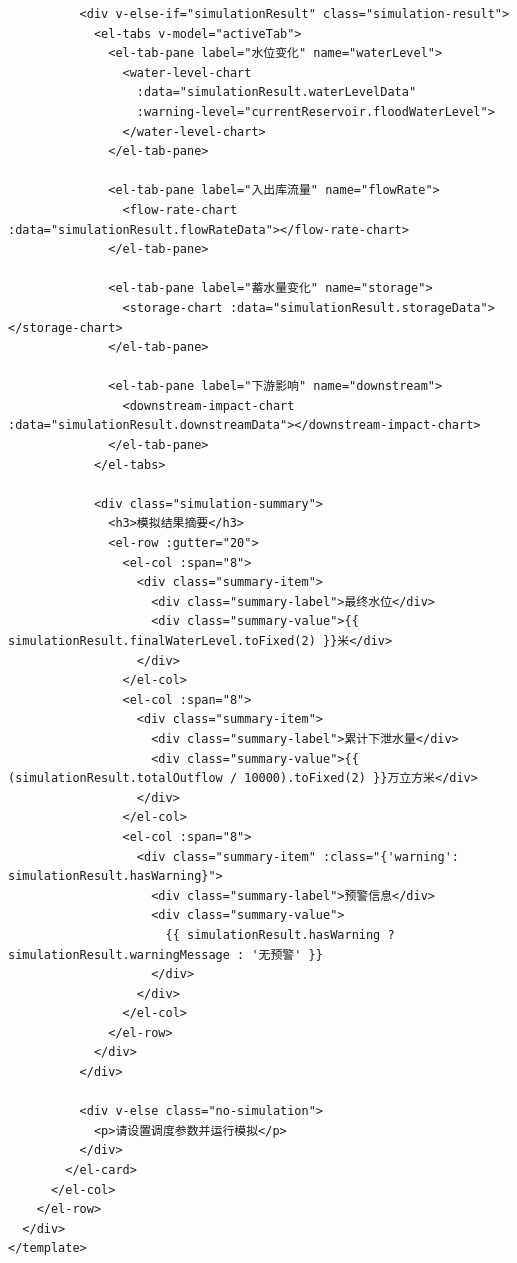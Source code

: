 \begin{lstlisting}
          <div v-else-if="simulationResult" class="simulation-result">
            <el-tabs v-model="activeTab">
              <el-tab-pane label="水位变化" name="waterLevel">
                <water-level-chart 
                  :data="simulationResult.waterLevelData"
                  :warning-level="currentReservoir.floodWaterLevel">
                </water-level-chart>
              </el-tab-pane>
              
              <el-tab-pane label="入出库流量" name="flowRate">
                <flow-rate-chart :data="simulationResult.flowRateData"></flow-rate-chart>
              </el-tab-pane>
              
              <el-tab-pane label="蓄水量变化" name="storage">
                <storage-chart :data="simulationResult.storageData"></storage-chart>
              </el-tab-pane>
              
              <el-tab-pane label="下游影响" name="downstream">
                <downstream-impact-chart :data="simulationResult.downstreamData"></downstream-impact-chart>
              </el-tab-pane>
            </el-tabs>
            
            <div class="simulation-summary">
              <h3>模拟结果摘要</h3>
              <el-row :gutter="20">
                <el-col :span="8">
                  <div class="summary-item">
                    <div class="summary-label">最终水位</div>
                    <div class="summary-value">{{ simulationResult.finalWaterLevel.toFixed(2) }}米</div>
                  </div>
                </el-col>
                <el-col :span="8">
                  <div class="summary-item">
                    <div class="summary-label">累计下泄水量</div>
                    <div class="summary-value">{{ (simulationResult.totalOutflow / 10000).toFixed(2) }}万立方米</div>
                  </div>
                </el-col>
                <el-col :span="8">
                  <div class="summary-item" :class="{'warning': simulationResult.hasWarning}">
                    <div class="summary-label">预警信息</div>
                    <div class="summary-value">
                      {{ simulationResult.hasWarning ? simulationResult.warningMessage : '无预警' }}
                    </div>
                  </div>
                </el-col>
              </el-row>
            </div>
          </div>
          
          <div v-else class="no-simulation">
            <p>请设置调度参数并运行模拟</p>
          </div>
        </el-card>
      </el-col>
    </el-row>
  </div>
</template>


\end{lstlisting}
